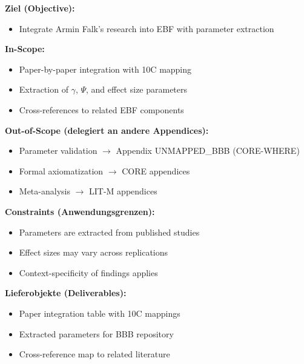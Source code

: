 
\begin{tcolorbox}[
    colback=orange!5!white,
    colframe=orange!75!black,
    title={\textbf{Appendix Scope: Ziel / In-Scope / Out-of-Scope / Constraints}},
    fonttitle=\bfseries
]

\textbf{Ziel (Objective):}
\begin{itemize}[nosep]
    \item Integrate Armin Falk's research into EBF with parameter extraction
\end{itemize}

\textbf{In-Scope:}
\begin{itemize}[nosep]
    \item Paper-by-paper integration with 10C mapping
    \item Extraction of $\gamma$, $\Psi$, and effect size parameters
    \item Cross-references to related EBF components
\end{itemize}

\textbf{Out-of-Scope (delegiert an andere Appendices):}
\begin{itemize}[nosep]
    \item Parameter validation $\rightarrow$ Appendix UNMAPPED_BBB (CORE-WHERE)
    \item Formal axiomatization $\rightarrow$ CORE appendices
    \item Meta-analysis $\rightarrow$ LIT-M appendices
\end{itemize}

\textbf{Constraints (Anwendungsgrenzen):}
\begin{itemize}[nosep]
    \item Parameters are extracted from published studies
    \item Effect sizes may vary across replications
    \item Context-specificity of findings applies
\end{itemize}

\textbf{Lieferobjekte (Deliverables):}
\begin{itemize}[nosep]
    \item Paper integration table with 10C mappings
    \item Extracted parameters for BBB repository
    \item Cross-reference map to related literature
\end{itemize}

\end{tcolorbox}

